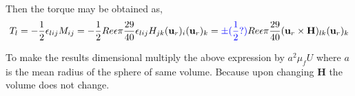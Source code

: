 \documentclass[12pt]{My_preprint}
\begin{document}
Then the torque may be obtained as, 
\begin{equation}
    T_l = - \frac{1}{2}\epsilon_{lij}M_{ij}
    =- \frac{1}{2} Re \epsilon \pi 
    \frac{29}{40} \epsilon_{lij}H_{jk}(\textbf{u}_r)_i  (\textbf{u}_r)_k
    =\color{blue}\pm(\frac{1}{2} ?)\color{black} Re \epsilon \pi 
    \frac{29}{40} (\textbf{u}_r\times \textbf{H})_{lk}  (\textbf{u}_r)_k
\end{equation}

To make the results dimensional multiply the above expression by $a^2 \mu_f U$ where $a$ is the mean radius of the sphere of same volume. Because upon changing $\textbf{H}$ the volume does not change. 





\appendix
\end{document}
